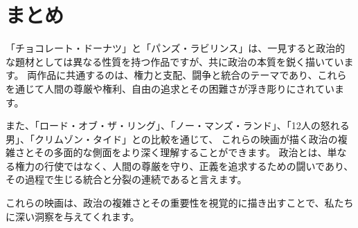 \documentclass[titlepage,a4paper]{jsarticle}
\begin{document}
\section{まとめ}
「チョコレート・ドーナツ」と「パンズ・ラビリンス」は、一見すると政治的な題材としては異なる性質を持つ作品ですが、共に政治の本質を鋭く描いています。
両作品に共通するのは、権力と支配、闘争と統合のテーマであり、これらを通じて人間の尊厳や権利、自由の追求とその困難さが浮き彫りにされています。

また、「ロード・オブ・ザ・リング」、「ノー・マンズ・ランド」、「12人の怒れる男」、「クリムゾン・タイド」との比較を通じて、
これらの映画が描く政治の複雑さとその多面的な側面をより深く理解することができます。
政治とは、単なる権力の行使ではなく、人間の尊厳を守り、正義を追求するための闘いであり、その過程で生じる統合と分裂の連続であると言えます。

これらの映画は、政治の複雑さとその重要性を視覚的に描き出すことで、私たちに深い洞察を与えてくれます。
\end{document}
